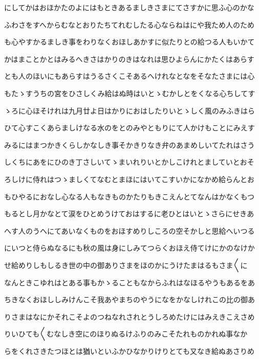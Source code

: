 \documentclass[a4paper,11pt,landscape]{ltjtarticle}
\begin{document}
\par\medskip
にしてかはおほかたのよにはもときあるましきさまにてさすかに思ふ心のかな
\par\medskip
ふわさをすへからむなとおりたちてれむしたる心ならねはにや我ため人のため
\par\medskip
も心やすかるましき事をわりなくおほしあかすに似たりとの給つる人もいかて
\par\medskip
かはまことかとはみるへきさはかりのきはなれは思ひよらんにかたくはあらす
\par\medskip
とも人のほいにもあらすはうるさくこそあるへけれなとなをそなたさまには心
\par\medskip
もたゝすうちの宮をひさしくみ給はぬ時はいとゝむかしとをくなる心ちしてす
\par\medskip
ゝろに心ほそけれは九月廿よ日はかりにおはしたりいとゝしく風のみふきはら
\par\medskip
ひて心すこくあらましけなる水のをとのみやともりにて人かけもことにみえす
\par\medskip
みるにはまつかきくらしかなしき事そかきりなき弁のあまめしいてたれはさう
\par\medskip
しくちにあをにひのき丁さしいてゝまいれりいとかしこけれとましていとおそ
\par\medskip
ろしけに侍れはつゝましくてなむとまほにはいてこすいかになかめ給らんとお
\par\medskip
もひやるにおなし心なる人もなきものかたりもきこえんとてなんはかなくもつ
\par\medskip
もるとし月かなとて涙をひとめうけておはするに老ひとはいとゝさらにせきあ
\par\medskip
へす人のうへにてあいなくものをおほすめりしころの空そかしと思給へいつる
\par\medskip
にいつと侍らぬなるにも秋の風は身にしみてつらくおほえ侍てけにかのなけか
\par\medskip
せ給めりしもしるき世の中の御ありさまをほのかにうけたまはるもさま〱に
\par\medskip
なんときこゆれはとある事もかゝることもなからふれはなほるやうもあるをあ
\par\medskip
ちきなくおほししみけんこそ我あやまちのやうになをかなしけれこの比の御あ
\par\medskip
りさまはなにかそれこそよのつねなれされとうしろめたけにはみえきこえさめ
\par\medskip
りいひても〱むなしき空にのほりぬるけふりのみこそたれものかれぬ事なか
\par\medskip
らをくれさきたつほとは猶いといふかひなかりけりとても又なき給ぬあさりめ
\end{document}
